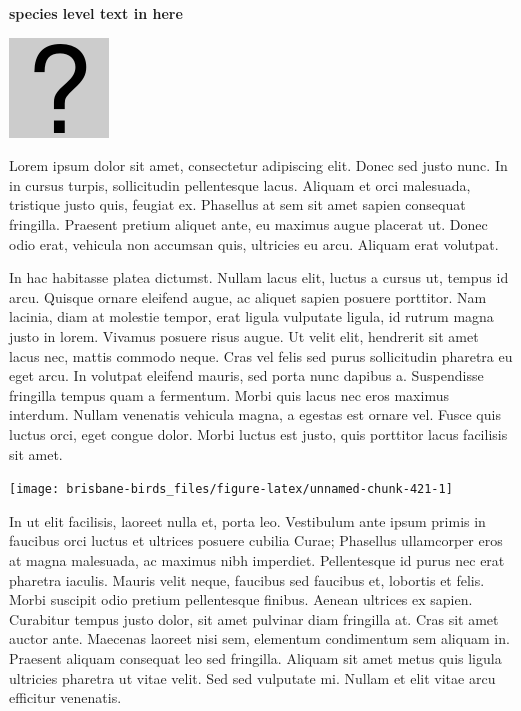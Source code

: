 \documentclass[]{book}
\let\origfigure\figure
\let\endorigfigure\endfigure
\renewenvironment{figure}[1][2] {
  \expandafter\origfigure\expandafter[H]
} {
  \endorigfigure
}
\begin{document}
\textbf{species level text in here}

\begin{figure}
\centering
\includegraphics{assets/missing.png}
\caption{No image for species}
\end{figure}

Lorem ipsum dolor sit amet, consectetur adipiscing elit. Donec sed justo
nunc. In in cursus turpis, sollicitudin pellentesque lacus. Aliquam et
orci malesuada, tristique justo quis, feugiat ex. Phasellus at sem sit
amet sapien consequat fringilla. Praesent pretium aliquet ante, eu
maximus augue placerat ut. Donec odio erat, vehicula non accumsan quis,
ultricies eu arcu. Aliquam erat volutpat.

In hac habitasse platea dictumst. Nullam lacus elit, luctus a cursus ut,
tempus id arcu. Quisque ornare eleifend augue, ac aliquet sapien posuere
porttitor. Nam lacinia, diam at molestie tempor, erat ligula vulputate
ligula, id rutrum magna justo in lorem. Vivamus posuere risus augue. Ut
velit elit, hendrerit sit amet lacus nec, mattis commodo neque. Cras vel
felis sed purus sollicitudin pharetra eu eget arcu. In volutpat eleifend
mauris, sed porta nunc dapibus a. Suspendisse fringilla tempus quam a
fermentum. Morbi quis lacus nec eros maximus interdum. Nullam venenatis
vehicula magna, a egestas est ornare vel. Fusce quis luctus orci, eget
congue dolor. Morbi luctus est justo, quis porttitor lacus facilisis sit
amet.

\begin{figure}
\texttt{[image: brisbane-birds\_files/figure-latex/unnamed-chunk-421-1]} \caption{insert figure caption}\label{fig:unnamed-chunk-421}
\end{figure}

In ut elit facilisis, laoreet nulla et, porta leo. Vestibulum ante ipsum
primis in faucibus orci luctus et ultrices posuere cubilia Curae;
Phasellus ullamcorper eros at magna malesuada, ac maximus nibh
imperdiet. Pellentesque id purus nec erat pharetra iaculis. Mauris velit
neque, faucibus sed faucibus et, lobortis et felis. Morbi suscipit odio
pretium pellentesque finibus. Aenean ultrices ex sapien. Curabitur
tempus justo dolor, sit amet pulvinar diam fringilla at. Cras sit amet
auctor ante. Maecenas laoreet nisi sem, elementum condimentum sem
aliquam in. Praesent aliquam consequat leo sed fringilla. Aliquam sit
amet metus quis ligula ultricies pharetra ut vitae velit. Sed sed
vulputate mi. Nullam et elit vitae arcu efficitur venenatis.
\end{document}
